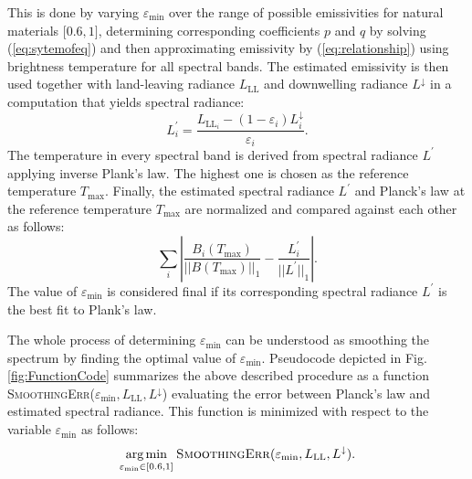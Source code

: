 This is done by varying $\varepsilon_\mathrm{min}$ over the range  {of possible emissivities for natural materials $[0.6,1{ {]}}$}, determining corresponding coefficients $ {p}$ and $ {q}$ by solving (\ref{eq:sytemofeq}) and then approximating emissivity by (\ref{eq:relationship}) using brightness temperature for all spectral bands. The estimated emissivity is then used together with land-leaving radiance $L_\mathrm{LL}$ and downwelling radiance $L^\downarrow$ in a computation that yields spectral radiance:
\begin{equation}
	L^{\prime}_{ {i}} = \frac{L_{\mathrm{LL}_{ {i}}}-(1-\varepsilon_{ {i}})L^\downarrow_{ {i}}}{\varepsilon_{ {i}}}.
	\label{eq:lprime}
\end{equation}
The temperature in every spectral band is derived from spectral radiance $L^{\prime}$ applying inverse Plank's law. The highest one is chosen as the reference temperature $T_\mathrm{max}$. Finally, the estimated spectral radiance $L^{\prime}$ and Planck's law at the reference temperature $T_\mathrm{max}$ are normalized and compared against each other as follows:
\begin{equation}
	\sum_{ {i}} \left| \frac{B_{ {i}}(T_\mathrm{max})}{||B(T_\mathrm{max})||_1} - \frac{L^\prime_{ {i}}}{||L^\prime||_1} \right|.
\end{equation}
The value of $\varepsilon_\mathrm{min}$ is considered final if its corresponding spectral radiance $L^{\prime}$  {is the best fit to Plank's law}.

The whole process of determining $\varepsilon_\mathrm{min}$ can be understood as smoothing the spectrum by finding the optimal value of $\varepsilon_\mathrm{min}$. Pseudocode depicted in Fig. \ref{fig:FunctionCode} summarizes the above described procedure as a function \textsc{SmoothingErr}($\varepsilon_\mathrm{min},L_\mathrm{LL},L^\downarrow$) evaluating the error between Planck's law and estimated spectral radiance. This function is minimized with respect to the variable $\varepsilon_\mathrm{min}$ as follows:
\begin{equation}
\underset{\varepsilon_\mathrm{min} \in  {[0.6,1]}}{\text{arg\,min}}\:\text{\textsc{SmoothingErr}}(\varepsilon_\mathrm{min},L_\mathrm{LL},L^\downarrow).
\label{eq:costFunction}
\end{equation}


